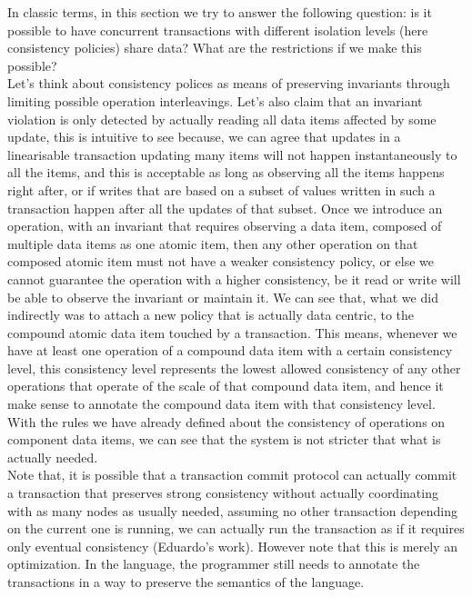 In classic terms, in this section we try to answer the following question: is it
possible to have concurrent transactions with different isolation levels (here
consistency policies) share data? What are the restrictions if we make this
possible? \\

Let's think about consistency polices as means of preserving invariants through 
limiting possible operation interleavings. Let's also claim that an invariant violation 
is only detected by actually reading all data items affected by some update, this is 
intuitive to see because, we can agree that updates in a linearisable transaction 
updating many items will not happen instantaneously to all the items, and this is 
acceptable as long as observing all the items happens right after, or if writes that 
are based on a subset of values written in such a transaction happen after all the
updates of that subset. Once we introduce an operation, with an invariant that requires 
observing a data item, composed of multiple data items as one atomic item, then any other 
operation on that composed atomic item must not have a weaker consistency policy, or else 
we cannot guarantee the operation with a higher consistency, be it read or write will be
able to observe the invariant or maintain it. We can see that, what we did indirectly was 
to attach a new policy that is actually data centric, to the compound atomic data item 
touched by a transaction. This means, whenever we have at least one operation of a 
compound data item with a certain consistency level, this consistency level represents 
the lowest allowed consistency of any other operations that operate of the scale of that 
compound data item, and hence it make sense to annotate the compound data item with that
consistency level. With the rules we have already defined about the consistency of 
operations on component data items, we can see that the system is not stricter that what 
is actually needed. \\

Note that, it is possible that a transaction commit protocol can actually commit
a transaction that preserves strong consistency without actually coordinating
with as many nodes as usually needed, assuming no other transaction depending on
the current one is running, we can actually run the transaction as if it
requires only eventual consistency (Eduardo's work). However note that this is
merely an optimization. In the language, the programmer still needs to annotate
the transactions in a way to preserve the semantics of the language. \\

